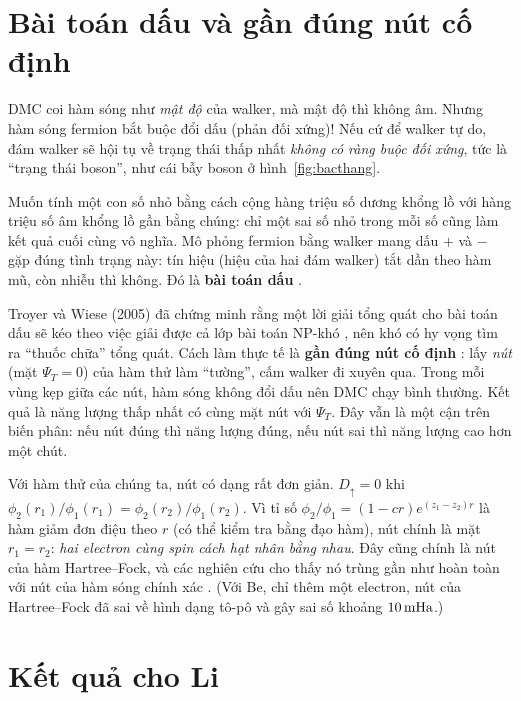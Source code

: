 \section{Bài toán dấu và gần đúng nút cố định}

DMC coi hàm sóng như \emph{mật độ} của walker, mà mật độ thì không âm. Nhưng hàm sóng fermion bắt buộc đổi dấu (phản đối xứng)! Nếu cứ để walker tự do, đám walker sẽ hội tụ về trạng thái thấp nhất \emph{không có ràng buộc đối xứng}, tức là ``trạng thái boson'', như cái bẫy boson ở hình~\ref{fig:bacthang}.

\begin{eli5}
Muốn tính một con số nhỏ bằng cách cộng hàng triệu số dương khổng lồ với hàng triệu số âm khổng lồ gần bằng chúng: chỉ một sai số nhỏ trong mỗi số cũng làm kết quả cuối cùng vô nghĩa. Mô phỏng fermion bằng walker mang dấu $+$ và $-$ gặp đúng tình trạng này: tín hiệu (hiệu của hai đám walker) tắt dần theo hàm mũ, còn nhiễu thì không. Đó là \textbf{bài toán dấu} .
\end{eli5}

Troyer và Wiese (2005) đã chứng minh rằng một lời giải tổng quát cho bài toán dấu sẽ kéo theo việc giải được cả lớp bài toán NP-khó \cite{TroyerWiese2005}, nên khó có hy vọng tìm ra ``thuốc chữa'' tổng quát. Cách làm thực tế là \textbf{gần đúng nút cố định}  \cite{Reynolds1982}: lấy \emph{nút} (mặt $\Psi_T=0$) của hàm thử làm ``tường'', cấm walker đi xuyên qua. Trong mỗi vùng kẹp giữa các nút, hàm sóng không đổi dấu nên DMC chạy bình thường. Kết quả là năng lượng thấp nhất có cùng mặt nút với $\Psi_T$. Đây vẫn là một cận trên biến phân: nếu nút đúng thì năng lượng đúng, nếu nút sai thì năng lượng cao hơn một chút.

Với hàm thử của chúng ta, nút có dạng rất đơn giản. $D_\uparrow=0$ khi $\phi_2(r_1)/\phi_1(r_1)=\phi_2(r_2)/\phi_1(r_2)$. Vì tỉ số $\phi_2/\phi_1=(1-cr)e^{(z_1-z_2)r}$ là hàm giảm đơn điệu theo $r$ (có thể kiểm tra bằng đạo hàm), nút chính là mặt $r_1=r_2$: \emph{hai electron cùng spin cách hạt nhân bằng nhau}. Đây cũng chính là nút của hàm Hartree--Fock, và các nghiên cứu cho thấy nó trùng gần như hoàn toàn với nút của hàm sóng chính xác \cite{Bressanini2001,Brown2007}. (Với Be, chỉ thêm một electron, nút của Hartree--Fock đã sai về hình dạng tô-pô và gây sai số khoảng $10\,\mathrm{mHa}$.)

\section{Kết quả cho Li}


